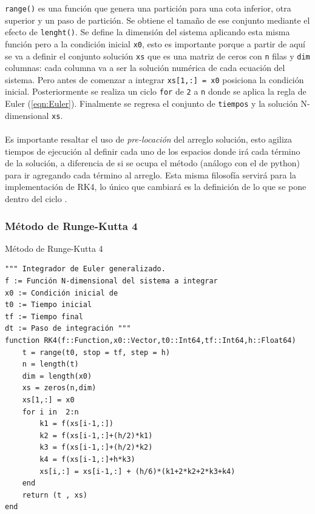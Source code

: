 \setlength{\parindent}{0cm}\texttt{range()} es una función que genera una partición para una cota inferior, otra superior y un paso de partición. Se obtiene el tamaño de ese conjunto mediante el efecto de \texttt{lenght()}. Se define la dimensión del sistema aplicando esta misma función pero a la condición inicial \texttt{x0}, esto es importante porque a partir de aquí se va a definir el conjunto solución \texttt{xs} que es una matriz de ceros con \texttt{n} filas y \texttt{dim} columnas: cada columna va a ser la solución numérica de cada ecuación del sistema. Pero antes de comenzar a integrar \texttt{xs[1,:] = x0} posiciona la condición inicial. Posteriormente se realiza un ciclo \texttt{for} de \texttt{2} a \texttt{n} donde se aplica la regla de Euler (\ref{eqn:Euler}). Finalmente se regresa el conjunto de \texttt{tiempos} y la solución N-dimensional \texttt{xs}.\\
\\
Es importante resaltar el uso de \textit{pre-locación} del arreglo solución, esto agiliza tiempos de ejecución al definir cada uno de los espacios donde irá cada término de la solución, a diferencia de si se ocupa el método  (análogo con el  de python) para ir agregando cada término al arreglo. Esta misma filosofía servirá para la implementación de RK4, lo único que cambiará es la definición de lo que se pone dentro del ciclo .
\subsubsection{Método de Runge-Kutta 4}\label{sec:RK4}

\begin{algorithm}
	\caption{Método de Runge-Kutta 4}
	\label{al:RK4}
	\begin{verbatim}
""" Integrador de Euler generalizado.
f := Función N-dimensional del sistema a integrar
x0 := Condición inicial de
t0 := Tiempo inicial
tf := Tiempo final
dt := Paso de integración """
function RK4(f::Function,x0::Vector,t0::Int64,tf::Int64,h::Float64)          
	t = range(t0, stop = tf, step = h)
	n = length(t)
	dim = length(x0)
	xs = zeros(n,dim)
	xs[1,:] = x0
	for i in  2:n
		k1 = f(xs[i-1,:])
		k2 = f(xs[i-1,:]+(h/2)*k1)
		k3 = f(xs[i-1,:]+(h/2)*k2)
		k4 = f(xs[i-1,:]+h*k3)
		xs[i,:] = xs[i-1,:] + (h/6)*(k1+2*k2+2*k3+k4)
	end
	return (t , xs)
end
	\end{verbatim}
\end{algorithm}

